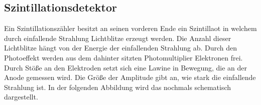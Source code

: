 \subsection{Szintillationsdetektor}
Ein Szintillationszähler besitzt an seinen vorderen Ende ein Szintillaot in welchem durch einfallende Strahlung Lichtblitze erzeugt werden. Die Anzahl dieser Lichtblitze hängt von der Energie der einfallenden Strahlung ab. Durch den Photoeffekt werden aus dem dahinter sitzten Photomultiplier Elektronen frei. Durch Stöße an den Elektroden setzt sich eine Lawine in Bewegung, die an der Anode gemessen wird. Die Größe der Amplitude gibt an, wie stark die einfallende Strahlung ist. In der folgenden Abbildung wird das nochmals schematisch dargestellt.

